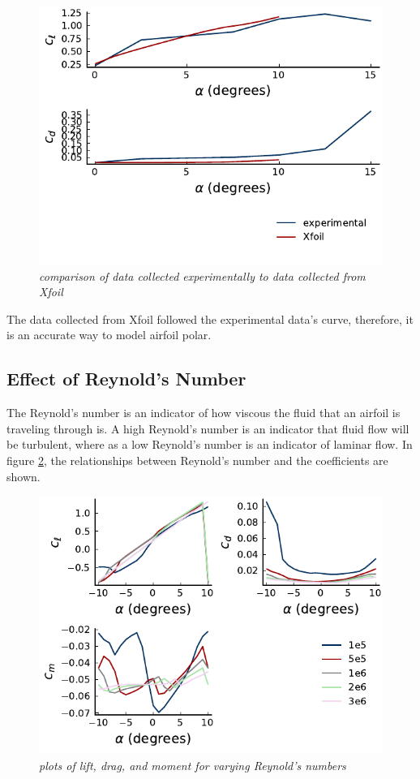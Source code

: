 \documentclass{journal}
\begin{document}
	\begin{figure}
		\centering
		\includegraphics{../graphics/airfoil-compare.pdf}
		\caption{\emph{comparison of data collected experimentally to data collected from Xfoil}}
		\label{fig:airfoil-comparison}
	\end{figure}

	The data collected from Xfoil followed the experimental data's curve, therefore, it is an accurate way to model airfoil polar.
	
	\subsection{Effect of Reynold's Number}
	The Reynold's number is an indicator of how viscous the fluid that an airfoil is traveling through is. A high Reynold's number is an indicator that fluid flow will be turbulent, where as a low Reynold's number is an indicator of laminar flow. In figure \ref{fig:altered-reynolds}, the relationships between Reynold's number and the coefficients are shown.
	
	\begin{figure}
		\centering
		\includegraphics{../graphics/altered-reynolds.pdf}
		\caption{\emph{plots of lift, drag, and moment for varying Reynold's numbers}}
		\label{fig:altered-reynolds}
	\end{figure}
	
\end{document}
